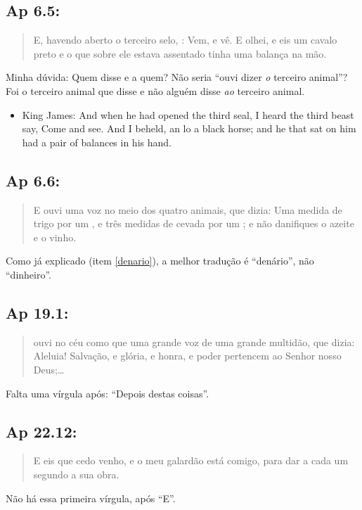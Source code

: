 \subsection{Ap 6.5:}
\begin{quote}
    \small
E, havendo aberto o terceiro selo, : Vem, e vê. E olhei, e eis um cavalo preto e o que sobre ele estava assentado tinha uma balança na mão.
\end{quote}

Minha dúvida: Quem disse e a quem? Não seria ``ouvi dizer \emph{o} terceiro animal''? Foi o terceiro animal que disse e não alguém disse \emph{ao} terceiro animal.

\begin{itemize}
\item King James: And when he had opened the third seal, I heard the third beast say, Come and see. And I beheld, an lo a black horse; and he that sat on him had a pair of balances in his hand.
\end{itemize}

\subsection{Ap 6.6:}
\begin{quote}
    \small
E ouvi uma voz no meio dos quatro animais, que dizia: Uma
medida de trigo por um , e três medidas de cevada por um ; e não danifiques o azeite e o vinho.
\end{quote}

Como já explicado (item \ref{denario}), a melhor tradução é ``denário'', não ``dinheiro''.

\subsection{Ap 19.1:}
\begin{quote}
    \small
{} ouvi no céu como que uma grande voz de uma grande multidão, que dizia: Aleluia! Salvação, e glória, e honra, e poder pertencem ao Senhor nosso Deus;\ldots
\end{quote}

Falta uma vírgula após: ``Depois destas coisas''.


\subsection{Ap 22.12:}
\begin{quote}
    \small
E\uwave{,} eis que cedo venho, e o meu galardão está comigo, para dar a cada um segundo a sua obra.
\end{quote}

Não há essa primeira vírgula, após ``E''.
